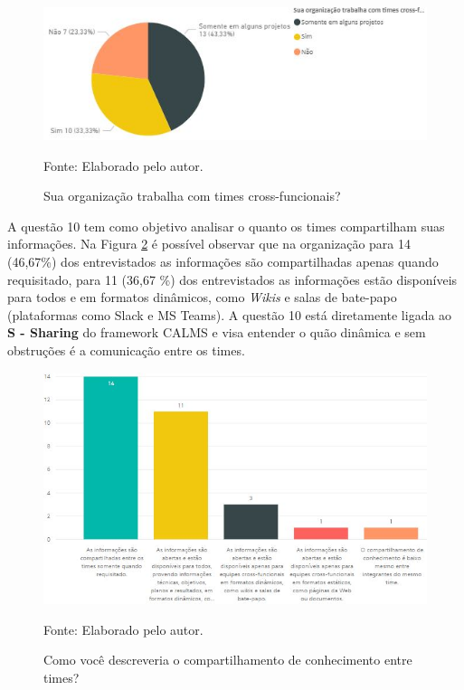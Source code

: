 \documentclass[twoside,english,brazilian]{UNISINOSartigo}
\newcommand{\source}[1]{\caption*{Fonte: {#1}} }
\begin{document}
\begin{figure}[H]
    \centering
    \caption{Sua organização trabalha com times cross-funcionais?}
       \includegraphics[scale=.63]{imagens/crossFuncionais_PBI.JPG}
        \source{Elaborado pelo autor.}
    \label{fig:crossFuncionais}
\end{figure}
A questão 10 tem como objetivo analisar o quanto os times compartilham suas informações. Na Figura \ref{fig:compartConhecimento} é possível observar que na organização para 14 (46,67\%) dos entrevistados as informações são compartilhadas apenas quando requisitado, para 11 (36,67 \%) dos entrevistados as informações estão disponíveis para todos e em formatos dinâmicos, como \textit{Wikis} e salas de bate-papo (plataformas como Slack e MS Teams). 
A questão 10 está diretamente ligada ao \textbf{S - Sharing} do framework CALMS e visa entender o quão dinâmica e sem obstruções é a comunicação entre os times. 
\newline
\begin{figure}[H]
    \centering
    \caption{Como você descreveria o compartilhamento de conhecimento entre times?}
       \includegraphics[scale=.6]{imagens/compartilhamentoConhecimento.JPG}
        \source{Elaborado pelo autor.}
    \label{fig:compartConhecimento}
\end{figure}
\end{document}
